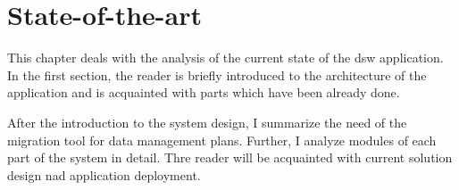 \chapter{State-of-the-art}\label{cptr:state-of-the-art}

This chapter deals with the analysis of the current state of the \gls{dsw} application.
In the first section, the reader is briefly introduced to the architecture of the application and is acquainted with parts which have been already done.

After the introduction to the system design, I summarize the need of the migration tool for data management plans.
Further, I analyze modules of each part of the system in detail.
Thre reader will be acquainted with current solution design nad application deployment.









